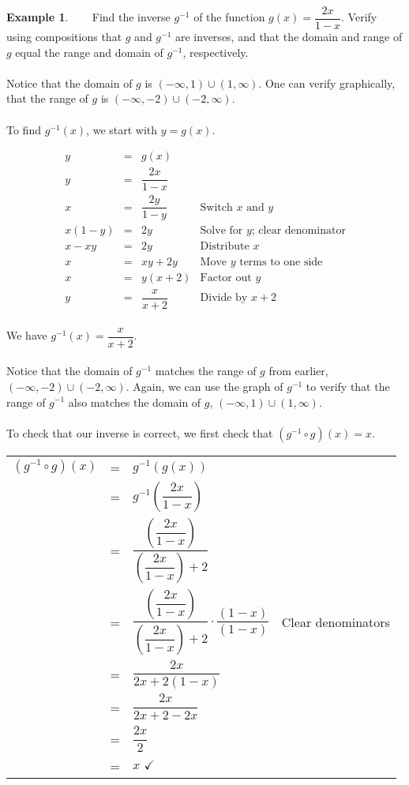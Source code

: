 \documentclass[11pt]{book}
\theoremstyle{definition}  %
\newtheorem{example}{Example}[chapter]
\begin{document}
\begin{example}~~~  Find the inverse $g^{-1}$ of the function $g(x) = \dfrac{2x}{1-x}$.  Verify using compositions that $g$ and $g^{-1}$ are inverses, and that the domain and range of $g$ equal the range and domain of $g^{-1}$, respectively.\\
~\\
Notice that the domain of $g$ is $(-\infty,1) \cup (1, \infty)$.  One can verify graphically, that the range of $g$ is $(-\infty,-2) \cup (-2, \infty)$.\\
~\\
To find $g^{-1}(x)$, we start with $y=g(x)$.

\[ \begin{array}{rclr}
y & = & g(x) & \\ [5pt]
y & = &  \dfrac{2x}{1-x} & \\ [7pt]
x & = & \dfrac{2y}{1-y} & \mbox{Switch $x$ and $y$} \\ [3pt]
x(1-y) & = & 2y & \mbox{Solve for $y$; clear denominator} \\ [3pt]
x-xy & = & 2y & \mbox{Distribute $x$}\\ [3pt]
x & = & xy + 2y & \mbox{Move $y$ terms to one side}\\ [3pt]
x & = & y(x+2) & \mbox{Factor out $y$}\\ [8pt]
y & = & \dfrac{x}{x+2} & \mbox{Divide by $x+2$}\\ [8pt]
\end{array} \]

We have $g^{-1}(x) = \dfrac{x}{x+2}$.\\
~\\
Notice that the domain of $g^{-1}$ matches the range of $g$ from earlier,\\
$(-\infty,-2) \cup (-2, \infty)$.  Again, we can use the graph of $g^{-1}$ to verify that the range of $g^{-1}$ also matches the domain of $g$, $(-\infty,1) \cup (1, \infty)$.\\
~\\
To check that our inverse is correct, we first check that $\left(g^{-1} \circ g \right)(x) = x $.

\begin{longtable}{rclr}
$\left(g^{-1} \circ g \right)(x)$ & = & $g^{-1}(g(x))$ & \\ [7pt]
& = & $g^{-1} \left(\dfrac{2x}{1-x}\right)$ & \\ [20pt]
& = & $\dfrac{ \left(\dfrac{2x}{1-x}\right)}{ \left(\dfrac{2x}{1-x}\right)+2}$ & \\ [30pt]
& = & $\dfrac{ \left(\dfrac{2x}{1-x}\right)}{ \left(\dfrac{2x}{1-x}\right)+2} \cdot \dfrac{(1-x)}{(1-x)}$ & Clear denominators \\ [15pt]
& = & $\dfrac{ 2x}{ 2x + 2(1-x)}$ & \\ [15pt]
& = & $\dfrac{2x}{2x+2-2x}$ & \\ [15pt]
& = & $\dfrac{2x}{2}$ & \\ [7pt]
& = & $x \, \, \checkmark$ & \\
\end{longtable}


\end{example}
\end{document}
